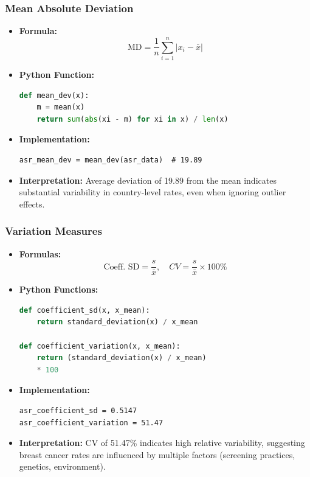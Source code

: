 \begin{frame}[fragile]
    \frametitle{Mean Absolute Deviation}
    \begin{itemize}
        \item \textbf{Formula:}
        \[
        \text{MD} = \frac{1}{n} \sum_{i=1}^n |x_i - \bar{x}|
        \]
        
        \item \textbf{Python Function:}
        \begin{lstlisting}[language=Python, breaklines=true]
def mean_dev(x):
    m = mean(x)
    return sum(abs(xi - m) for xi in x) / len(x)
        \end{lstlisting}
        
        \item \textbf{Implementation:}
        \begin{lstlisting}
asr_mean_dev = mean_dev(asr_data)  # 19.89
        \end{lstlisting}
        
        \item \textbf{Interpretation:} Average deviation of \SI{19.89}{\perthousand} from the mean indicates substantial variability in country-level rates, even when ignoring outlier effects.
    \end{itemize}
\end{frame}

\begin{frame}[fragile]
    \frametitle{Variation Measures}
    \begin{itemize}
        \item \textbf{Formulas:}
        \[
        \text{Coeff. SD} = \frac{s}{\bar{x}},\quad CV = \frac{s}{\bar{x}} \times 100\%
        \]
        
        \item \textbf{Python Functions:}
        \begin{lstlisting}[language=Python, breaklines=true]
def coefficient_sd(x, x_mean):
    return standard_deviation(x) / x_mean

def coefficient_variation(x, x_mean):
    return (standard_deviation(x) / x_mean) 
    * 100
        \end{lstlisting}
        
        \item \textbf{Implementation:}
        \begin{lstlisting}
asr_coefficient_sd = 0.5147
asr_coefficient_variation = 51.47
        \end{lstlisting}
        
        \item \textbf{Interpretation:} CV of 51.47\% indicates high relative variability, suggesting breast cancer rates are influenced by multiple factors (screening practices, genetics, environment).
    \end{itemize}
\end{frame}

